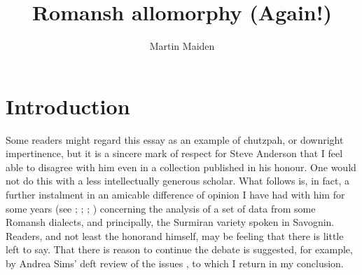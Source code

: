\documentclass[output=paper,
modfonts
]{LSP/langsci}
\title{Romansh allomorphy (Again!)}
\author{Martin Maiden\affiliation{Oxford University}}
\begin{document}
\maketitle

\section{Introduction}\label{introductionM}

Some readers might regard this essay as an example of chutzpah, or
downright impertinence, but it is a sincere mark of respect for Steve
Anderson that I feel able to disagree with him even in a collection
published in his honour. One would not do this with a less
intellectually generous scholar. What follows is, in fact, a further
instalment in an amicable difference of opinion I have had with him for
some years (see \citealt{anderson2008a}; \citealt{anderson2011a}; \citealt{maiden2011a}; \citealt{anderson2013stem}) concerning the analysis of a set of data from some Romansh
dialects, and principally, the Surmiran variety spoken in Savognin.
Readers, and not least the honorand himself, may be feeling that there
is little left to say. That there is reason to continue the debate is
suggested, for example, by Andrea Sims' deft review of the issues \citep[202--206]{Sims15:book}, to which I return in my conclusion.
\end{document}
